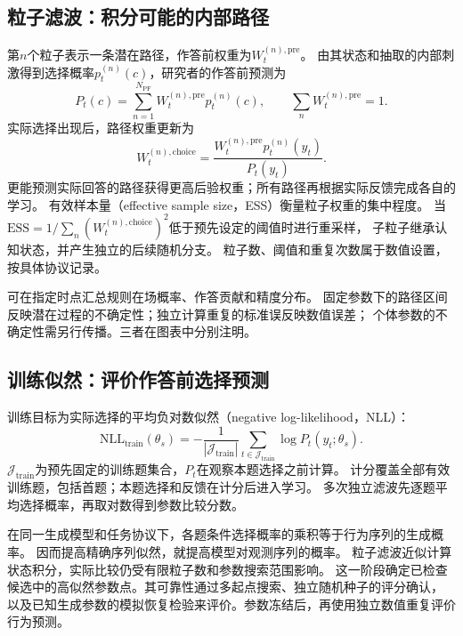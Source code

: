 \documentclass[11pt,a4paper]{article}
\numberwithin{equation}{section}
\begin{document}
\subsection{粒子滤波：积分可能的内部路径}
第$n$个粒子表示一条潜在路径，作答前权重为$W_t^{(n),\mathrm{pre}}$。
由其状态和抽取的内部刺激得到选择概率$p_t^{(n)}(c)$，研究者的作答前预测为
\begin{equation}
P_t(c)=\sum_{n=1}^{N_{\mathrm{PF}}}W_t^{(n),\mathrm{pre}}p_t^{(n)}(c),\qquad
\sum_nW_t^{(n),\mathrm{pre}}=1.
\label{eq:pf-predict}
\end{equation}
实际选择出现后，路径权重更新为
\begin{equation}
W_t^{(n),\mathrm{choice}}=
\frac{W_t^{(n),\mathrm{pre}}p_t^{(n)}(y_t)}{P_t(y_t)}.
\label{eq:pf-update}
\end{equation}
更能预测实际回答的路径获得更高后验权重；所有路径再根据实际反馈完成各自的学习。
有效样本量（effective sample size，ESS）衡量粒子权重的集中程度。
当$\mathrm{ESS}=1/\sum_n(W_t^{(n),\mathrm{choice}})^2$低于预先设定的阈值时进行重采样，
子粒子继承认知状态，并产生独立的后续随机分支。
粒子数、阈值和重复次数属于数值设置，按具体协议记录。

可在指定时点汇总规则在场概率、作答贡献和精度分布。
固定参数下的路径区间反映潜在过程的不确定性；独立计算重复的标准误反映数值误差；
个体参数的不确定性需另行传播。三者在图表中分别注明。

\subsection{训练似然：评价作答前选择预测}
训练目标为实际选择的平均负对数似然（negative log-likelihood，NLL）：
\begin{equation}
\mathrm{NLL}_{\mathrm{train}}(\theta_s)=
-\frac1{|\mathcal J_{\mathrm{train}}|}\sum_{t\in\mathcal J_{\mathrm{train}}}
\log P_t(y_t;\theta_s).
\label{eq:objective}
\end{equation}
$\mathcal J_{\mathrm{train}}$为预先固定的训练题集合，$P_t$在观察本题选择之前计算。
计分覆盖全部有效训练题，包括首题；本题选择和反馈在计分后进入学习。
多次独立滤波先逐题平均选择概率，再取对数得到参数比较分数。

在同一生成模型和任务协议下，各题条件选择概率的乘积等于行为序列的生成概率。
因而提高精确序列似然，就提高模型对观测序列的概率。
粒子滤波近似计算状态积分，实际比较仍受有限粒子数和参数搜索范围影响。
这一阶段确定已检查候选中的高似然参数点。其可靠性通过多起点搜索、独立随机种子的评分确认，
以及已知生成参数的模拟恢复检验来评价。参数冻结后，再使用独立数值重复评价行为预测。
\end{document}
